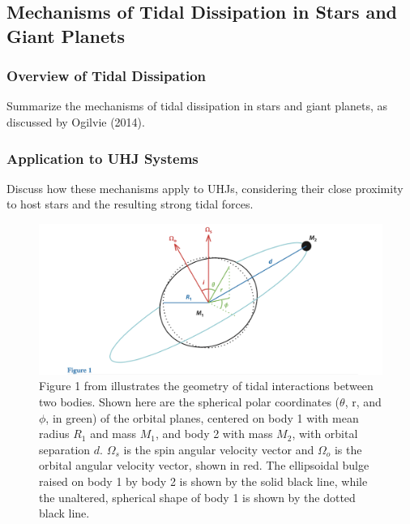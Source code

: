 \documentclass[oneside,12pt]{amsart}
\numberwithin{page}{section}
\begin{document}
\clearpage




\subsection{Mechanisms of Tidal Dissipation in Stars and Giant Planets}\label{sec:tidaldissipation}

\subsubsection{Overview of Tidal Dissipation}
Summarize the mechanisms of tidal dissipation in stars and giant planets, as discussed by Ogilvie (2014).



\subsubsection{Application to UHJ Systems}
Discuss how these mechanisms apply to UHJs, considering their close proximity to host stars and the resulting strong tidal forces.

\begin{figure}[htbp]
    \centering
    \includegraphics[width=\linewidth]{figs/ogilvie_fig1.png}
    \caption{Figure 1 from \citet{ogilvie2014tidal} illustrates the geometry of tidal interactions between two bodies. Shown here are the spherical polar coordinates ($\theta$, r, and $\phi$, in green) of the orbital planes, centered on body 1 with mean radius $R_1$ and mass $M_1$, and body 2 with mass $M_2$, with orbital separation $d$. $\Omega_s$ is the spin angular velocity vector and $\Omega_o$ is the orbital angular velocity vector, shown in red. The ellipsoidal bulge raised on body 1 by body 2 is shown by the solid black line, while the unaltered, spherical shape of body 1 is shown by the dotted black line.}
    \label{fig:ogilvie-fig1}
\end{figure}
\end{document}
